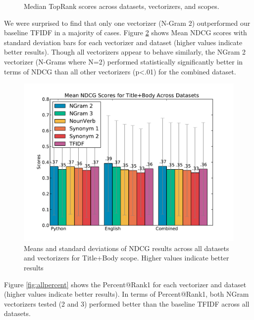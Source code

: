 \documentclass{acm_proc_article-sp}
\begin{document}
\begin{figure}[!htb]
\endminipage

\caption{Median TopRank scores across datasets, vectorizers, and scopes.}
\label{fig:toprankmedians}
\centering
\end{figure}



We were surprised to find that only one vectorizer (N-Gram 2) outperformed our baseline TFIDF in a majority of cases. Figure \ref{fig:allmeans} shows Mean NDCG scores with standard deviation bars for each vectorizer and dataset (higher values indicate better results). Though all vectorizers appear to behave similarly, the NGram 2 vectorizer (N-Grams where N=2) performed statistically significantly better in terms of NDCG than all other vectorizers (p<.01) for the combined dataset.

\begin{figure}[h]
\centering
\includegraphics[width=1\columnwidth]{images/all-means-by-dataset_plot.pdf}
\caption{Means and standard deviations of NDCG results across all datasets and vectorizers for Title+Body scope. Higher values indicate better results}
\label{fig:allmeans}
\end{figure}

	
Figure \ref{fig:allpercent} shows the Percent@Rank1 for each vectorizer and dataset (higher values indicate better results). In terms of Percent@Rank1, both NGram vectorizers tested (2 and 3) performed better than the baseline TFIDF across all datasets. 
\end{document}
